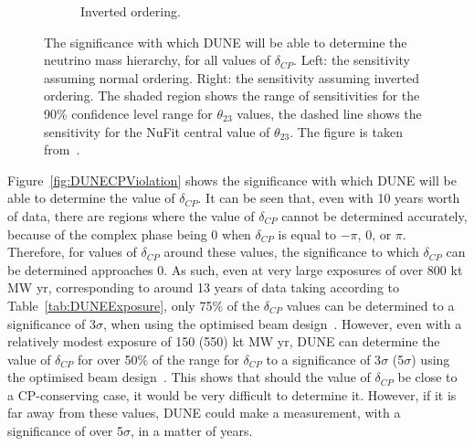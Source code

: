 \begin{figure}
\begin{subfigure}{0.49\textwidth}
    \caption{Inverted ordering.}
  \end{subfigure}
  \caption[The significance with which DUNE will be able to determine the neutrino mass hierarchy, for all values of $\delta_{CP}$]
          {The significance with which DUNE will be able to determine the neutrino mass hierarchy, for all values of $\delta_{CP}$. Left: the sensitivity assuming normal ordering. Right: the sensitivity assuming inverted ordering. The shaded region shows the range of sensitivities for the 90\% confidence level range for $\theta_{23}$ values, the dashed line shows the sensitivity for the NuFit central value of $\theta_{23}$. The figure is taken from~\citep{DUNE2335}.}
  \label{fig:DUNEMassHierarchy}
\end{figure}

Figure~\ref{fig:DUNECPViolation} shows the significance with which DUNE will be able to determine the value of $\delta_{CP}$. It can be seen that, even with 10 years worth of data, there are regions where the value of $\delta_{CP}$ cannot be determined accurately, because of the complex phase being 0 when $\delta_{CP}$ is equal to $-\pi$, 0, or $\pi$. Therefore, for values of $\delta_{CP}$ around these values, the significance to which $\delta_{CP}$ can be determined approaches 0. As such, even at very large exposures of over 800 kt MW yr, corresponding to around 13 years of data taking according to Table~\ref{tab:DUNEExposure}, only 75\% of the $\delta_{CP}$ values can be determined to a significance of 3$\sigma$, when using the optimised beam design~\citep{DUNE2401}. However, even with a relatively modest exposure of 150 (550) kt MW yr, DUNE can determine the value of $\delta_{CP}$ for over 50\% of the range for $\delta_{CP}$ to a significance of 3$\sigma$ (5$\sigma$) using the optimised beam design~\citep{DUNE2401}. This shows that should the value of $\delta_{CP}$ be close to a CP-conserving case, it would be very difficult to determine it. However, if it is far away from these values, DUNE could make a measurement, with a significance of over 5$\sigma$, in a matter of years. \\

